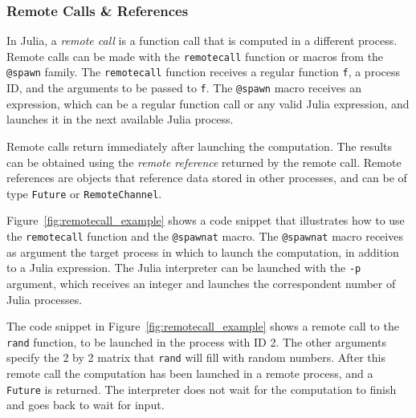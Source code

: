 \subsubsection{Remote Calls \& References}

In Julia, a \textit{remote call} is a function call that is computed in a different
process. Remote calls can be made with the \texttt{remotecall} function
or macros from the \texttt{@spawn} family. The \texttt{remotecall} function
receives a regular function \texttt{f}, a process ID, and the arguments to
be passed to \texttt{f}. The \texttt{@spawn} macro receives an expression,
which can be a regular function call or any valid Julia expression, and
launches it in the next available Julia process.

Remote calls return immediately after launching the computation. The
results can be obtained using the \textit{remote reference} returned
by the remote call. Remote references are objects that reference data
stored in other processes, and can be of type \texttt{Future} or
\texttt{RemoteChannel}.

Figure~\ref{fig:remotecall_example} shows a code snippet that illustrates how
to use the \texttt{remotecall} function and the \texttt{@spawnat} macro. The
\texttt{@spawnat} macro receives as argument the target process in which to
launch the computation, in addition to a Julia expression. The Julia
interpreter can be launched with the \texttt{-p} argument, which receives an
integer and launches the correspondent number of Julia processes.

The code snippet in Figure~\ref{fig:remotecall_example} shows a remote call to
the \texttt{rand} function, to be launched in the process with ID 2. The other
arguments specify the 2 by 2 matrix that \texttt{rand} will fill with random
numbers. After this remote call the computation has been launched in a remote
process, and a \texttt{Future} is returned. The interpreter does not wait for
the computation to finish and goes back to wait for input.

